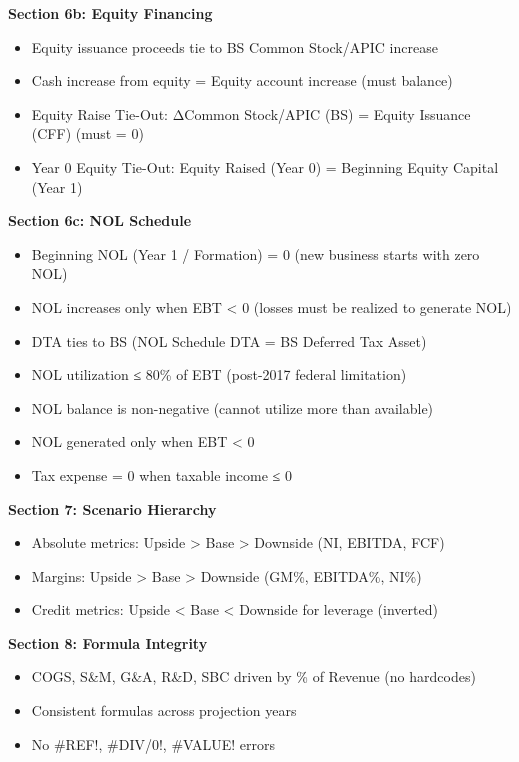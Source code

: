 \documentclass[11pt]{article}
\begin{document}
\textbf{Section 6b: Equity Financing}

\begin{itemize}[leftmargin=*,itemsep=2pt,topsep=2pt]
\item {} Equity issuance proceeds tie to BS Common Stock/APIC increase
\item {} Cash increase from equity = Equity account increase (must balance)
\item {} Equity Raise Tie-Out: ΔCommon Stock/APIC (BS) = Equity Issuance (CFF) (must = 0)
\item {} Year 0 Equity Tie-Out: Equity Raised (Year 0) = Beginning Equity Capital (Year 1)
\end{itemize}

\textbf{Section 6c: NOL Schedule}

\begin{itemize}[leftmargin=*,itemsep=2pt,topsep=2pt]
\item {} Beginning NOL (Year 1 / Formation) = 0 (new business starts with zero NOL)
\item {} NOL increases only when EBT < 0 (losses must be realized to generate NOL)
\item {} DTA ties to BS (NOL Schedule DTA = BS Deferred Tax Asset)
\item {} NOL utilization ≤ 80\% of EBT (post-2017 federal limitation)
\item {} NOL balance is non-negative (cannot utilize more than available)
\item {} NOL generated only when EBT < 0
\item {} Tax expense = 0 when taxable income ≤ 0
\end{itemize}

\textbf{Section 7: Scenario Hierarchy}

\begin{itemize}[leftmargin=*,itemsep=2pt,topsep=2pt]
\item {} Absolute metrics: Upside > Base > Downside (NI, EBITDA, FCF)
\item {} Margins: Upside > Base > Downside (GM\%, EBITDA\%, NI\%)
\item {} Credit metrics: Upside < Base < Downside for leverage (inverted)
\end{itemize}

\textbf{Section 8: Formula Integrity}

\begin{itemize}[leftmargin=*,itemsep=2pt,topsep=2pt]
\item {} COGS, S\&M, G\&A, R\&D, SBC driven by \% of Revenue (no hardcodes)
\item {} Consistent formulas across projection years
\item {} No \#REF!, \#DIV/0!, \#VALUE! errors
\end{itemize}
\end{document}
